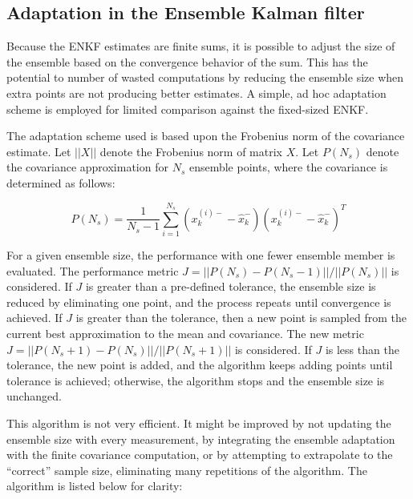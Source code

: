 \documentclass[]{article}
\begin{document}
\subsection{Adaptation in the Ensemble Kalman filter}

Because the ENKF estimates are finite sums, it is possible to adjust the size of the ensemble based on the convergence behavior of the sum. This has the potential to number of wasted computations by reducing the ensemble size when extra points are not producing better estimates. A simple, ad hoc adaptation scheme is employed for limited comparison against the fixed-sized ENKF.

The adaptation scheme used is based upon the Frobenius norm of the covariance estimate. Let $|| X ||$ denote the Frobenius norm of matrix $X$. Let $P(N_s)$ denote the covariance approximation for $N_s$ ensemble points, where the covariance is determined as follows:

\begin{equation}
P(N_s) = \frac{1}{N_s-1} \sum_{i=1}^{N_s} ({x}_k^{(i)-} - \hat{x}_k^{-})({x}_k^{(i)-} - \hat{x}_k^{-})^T
\end{equation}

For a given ensemble size, the performance with one fewer ensemble member is evaluated. The performance metric $J = || P(N_s) - P(N_s-1)||/||P(N_s)||$ is considered. If $J$ is greater than a pre-defined tolerance, the ensemble size is reduced by eliminating one point, and the process repeats until convergence is achieved. If $J$ is greater than the tolerance, then a new point is sampled from the current best approximation to the mean and covariance. The new metric $J = || P(N_s+1) - P(N_s) ||/||P(N_s+1)||$ is considered. If $J$ is less than the tolerance, the new point is added, and the algorithm keeps adding points until tolerance is achieved; otherwise, the algorithm stops and the ensemble size is unchanged. 

This algorithm is not very efficient. It might be improved by not updating the ensemble size with every measurement, by integrating the ensemble adaptation with the finite covariance computation, or by attempting to extrapolate to the ``correct'' sample size, eliminating many repetitions of the algorithm. The algorithm is listed below for clarity:
\end{document}
